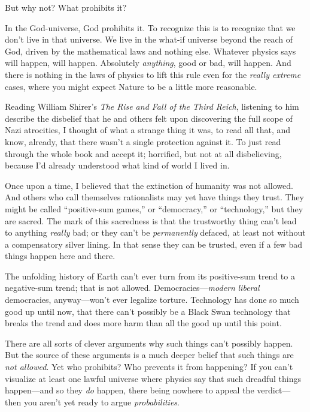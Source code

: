 {
 But why not? What prohibits it?}

{
 In the God-universe, God prohibits it. To recognize this is to
recognize that we don't live in that universe. We live
in the what-if universe beyond the reach of God, driven by the
mathematical laws and nothing else. Whatever physics says will happen,
will happen. Absolutely \textit{anything}, good or bad, will happen.
And there is nothing in the laws of physics to lift this rule even for
the \textit{really extreme} cases, where you might expect Nature to be
a little more reasonable.}

{
 Reading William Shirer's \textit{The Rise and Fall
of the Third Reich}, listening to him describe the disbelief that he
and others felt upon discovering the full scope of Nazi atrocities, I
thought of what a strange thing it was, to read all that, and know,
already, that there wasn't a single protection against
it. To just read through the whole book and accept it; horrified, but
not at all disbelieving, because I'd already understood
what kind of world I lived in.}

{
 Once upon a time, I believed that the extinction of humanity was
not allowed. And others who call themselves rationalists may yet have
things they trust. They might be called ``positive-sum
games,'' or
``democracy,'' or
``technology,'' but they are sacred.
The mark of this sacredness is that the trustworthy thing
can't lead to anything \textit{really} bad; or they
can't be \textit{permanently} defaced, at least not
without a compensatory silver lining. In that sense they can be
trusted, even if a few bad things happen here and there.}

{
 The unfolding history of Earth can't ever turn
from its positive-sum trend to a negative-sum trend; that is not
allowed. Democracies---\textit{modern} \textit{liberal} democracies,
anyway---won't ever legalize torture. Technology has
done so much good up until now, that there can't
possibly be a Black Swan technology that breaks the trend and does more
harm than all the good up until this point.}

{
 There are all sorts of clever arguments why such things
can't possibly happen. But the source of these
arguments is a much deeper belief that such things are \textit{not
allowed}. Yet who prohibits? Who prevents it from happening? If you
can't visualize at least one lawful universe where
physics say that such dreadful things happen---and so they \textit{do}
happen, there being nowhere to appeal the verdict---then you
aren't yet ready to argue \textit{probabilities}.}

